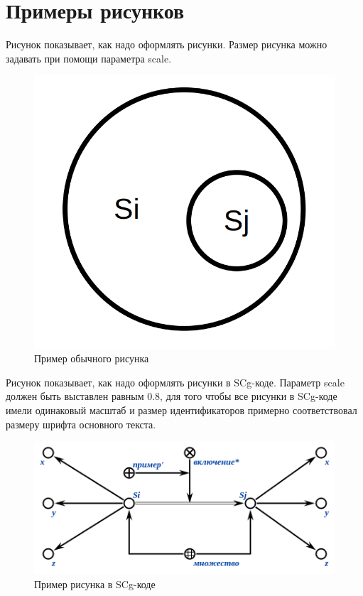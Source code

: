 \section*{Примеры рисунков}

Рисунок \textit{} показывает, как надо оформлять рисунки. Размер рисунка можно задавать при помощи параметра scale.

\begin{figure}[H]
	\includegraphics[scale=0.5]{images/fig_example.png}
	\caption{Пример обычного рисунка}
	\label{fig:example}
\end{figure}

Рисунок \textit{} показывает, как надо оформлять рисунки в SCg-коде. Параметр scale должен быть выставлен равным 0.8, для того чтобы все рисунки в SCg-коде имели одинаковый масштаб и размер идентификаторов примерно соответствовал размеру шрифта основного текста.  

\begin{figure}[H]
	\includegraphics[scale=0.8]{images/fig_example_scg.png}
	\caption{Пример рисунка в SCg-коде}
	\label{fig:example_scg}
\end{figure}
